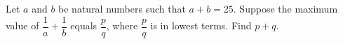 Let $a$ and $b$ be natural numbers such that $a+b=25$. Suppose the maximum value of $\dfrac{1}{a}+\dfrac{1}{b}$ equals $\dfrac{p}{q}$, where $\dfrac{p}{q}$ is in lowest terms. Find $p+q$.
